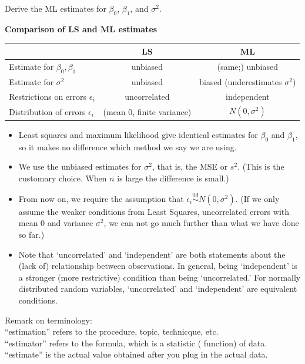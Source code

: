 \documentclass[12pt]{article}
\begin{document}
\exercise
Derive the ML estimates for
$\beta_0$, $\beta_1$, and $\sigma^2$.

\hrulefill

\textbf{Comparison of LS and ML estimates}

\begin{center}\begin{tabular}{l||c|c}
& LS & ML \\ \hline
Estimate for $\beta_0,\beta_1$
    & unbiased & (same;) unbiased \\
Estimate for $\sigma^2$
    & unbiased
    & biased (underestimates $\sigma^2$) \\
\hline
Restrictions on errors $\epsilon_i$
    & uncorrelated & independent \\
Distribution of errors $\epsilon_i$
    & (mean 0, finite variance) & $N(0,\sigma^2)$
\end{tabular}\end{center}

\begin{itemize}
\item Least squares and maximum likelihood give identical estimates for
 $\beta_0$ and $\beta_1$, so it makes no difference which method we say we are
 using.
\item We use the unbiased estimates for $\sigma^2$, that is, the MSE
    or $s^2$. (This is the customary choice.
    When $n$ is large the difference is small.)
\item From now on, we require the assumption that $\epsilon_i
\overset{\text{iid}}{\sim} N(0,\sigma^2)$.
(If we only assume the weaker conditions from Least Squares,
\ie uncorrelated errors with mean 0 and variance $\sigma^2$,
we can not go much further than what we have done so far.)
\item Note that `uncorrelated' and `independent' are both statements about the
(lack of) relationship between observations.  In general, being `independent' is a stronger
(more restrictive) condition than being `uncorrelated.'  For normally distributed
random variables, `uncorrelated' and `independent' are equivalent conditions.
\end{itemize}


Remark on terminology:\\
``estimation'' refers to the procedure, topic, technicque, etc.\\
``estimator'' refers to the formula, which is a statistic (\ie
function) of data.\\
``estimate'' is the actual value obtained after you plug in the
actual data.
\end{document}
